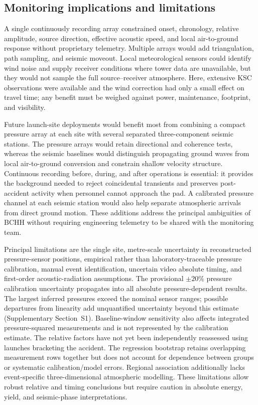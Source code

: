 \documentclass[]{seismica}
\begin{document}
\subsection{Monitoring implications and limitations}

A single continuously recording array constrained onset, chronology, relative
amplitude, source direction, effective acoustic speed, and local air-to-ground
response without proprietary telemetry. Multiple arrays would add
triangulation, path sampling, and seismic moveout. Local meteorological sensors
could identify wind noise and supply receiver conditions where tower data are
unavailable, but they would not sample the full source--receiver atmosphere.
Here, extensive KSC observations were available and the wind correction had
only a small effect on travel time; any benefit must be weighed against power,
maintenance, footprint, and visibility.

Future launch-site deployments would benefit most from combining a compact
pressure array at each site with several separated three-component seismic
stations. The pressure arrays would retain directional and coherence tests,
whereas the seismic baselines would distinguish propagating ground waves from
local air-to-ground conversion and constrain shallow velocity structure.
Continuous recording before, during, and after operations is essential: it
provides the background needed to reject coincidental transients and preserves
post-accident activity when personnel cannot approach the pad. A calibrated
pressure channel at each seismic station would also help separate atmospheric
arrivals from direct ground motion. These additions address the principal
ambiguities of BCHH without requiring engineering telemetry to be shared with
the monitoring team.

Principal limitations are the single site, metre-scale uncertainty in
reconstructed pressure-sensor positions, empirical rather than
laboratory-traceable pressure calibration, manual event identification, uncertain video
absolute timing, and first-order acoustic-radiation assumptions. The provisional
$\pm20\%$ pressure calibration uncertainty propagates into all absolute
pressure-dependent results. The largest inferred pressures exceed the nominal
sensor ranges; possible departures from linearity add unquantified uncertainty
beyond this estimate (Supplementary Section~S1). Baseline-window sensitivity
also affects integrated pressure-squared measurements and is not represented
by the calibration estimate. The relative factors have not
yet been independently reassessed using launches bracketing the accident. The regression
bootstrap retains overlapping measurement rows together but does not account
for dependence between groups or systematic calibration/model errors. Regional
association additionally lacks event-specific three-dimensional atmospheric
modelling. These limitations allow robust relative and timing conclusions but
require caution in absolute energy, yield, and seismic-phase interpretations.
\end{document}
